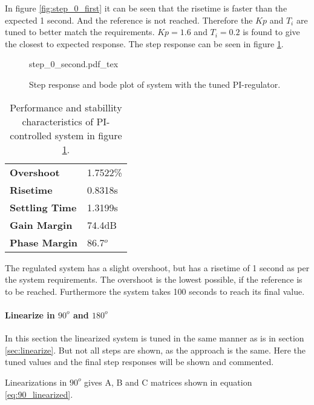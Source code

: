 \documentclass[../../../Main]{subfiles}
\begin{document}
In figure \ref{fig:step_0_first} it can be seen that the risetime is faster than the expected 1 second. And the reference is not reached. Therefore the $Kp$ and $T_i$ are tuned to better match the requirements. $Kp = 1.6$ and $T_i=0.2$ is found to give the closest to expected response. The step response can be seen in figure \ref{fig:step_0_second}.

\begin{figure}[H]
\centering
\def\svgwidth{\textwidth}
{step_0_second.pdf_tex}
\caption{Step response and bode plot of system with the tuned PI-regulator.}
\label{fig:step_0_second}
\end{figure}


\begin{table}[h]
	 \centering
	 \begin{tabular}{ll}
		 \textbf{Overshoot} & 1.7522\%\\
		 \textbf{Risetime}  & 0.8318s\\
		 \textbf{Settling Time} & 1.3199s\\
		 \textbf{Gain Margin} & 74.4dB\\
		 \textbf{Phase Margin} & 86.7$^o$
	 \end{tabular}
	 \caption{Performance and stabillity characteristics of PI-controlled system in figure \ref{fig:step_0_second}.}
	 \label{tab:performance_0_2}
\end{table}



The regulated system has a slight overshoot, but has a risetime of 1 second as per the system requirements. The overshoot is the lowest possible, if the reference is to be reached. Furthermore the system takes 100 seconds to reach its final value.

\paragraph{Linearize in $90^o$ and $180^o$}
In this section the linearized system is tuned in the same manner as is in section \ref{sec:linearize}. But not all steps are shown, as the approach is the same. Here the tuned values and the final step responses will be shown and commented.

Linearizations in $90^o$ gives A, B and C matrices shown in equation \ref{eq:90_linearized}.
\end{document}
